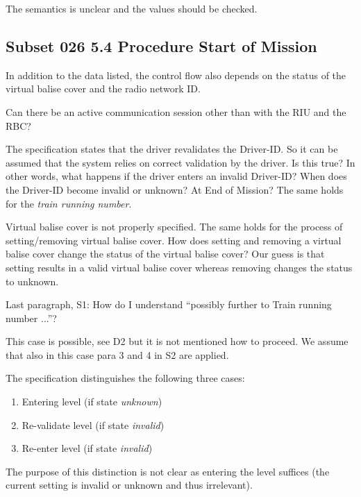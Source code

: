 \documentclass{template/openetcs_article}
\begin{document}
\resolution The semantics is unclear and the values should be checked.


\subsection{Subset 026 5.4 Procedure Start of Mission}

In addition to the data listed, the control flow also depends on the status of the virtual balise cover and the radio network ID.


Can there be an active communication session other than with the RIU and the RBC?

The specification states that the driver revalidates the Driver-ID. So it can be assumed that the system relies on correct validation by the driver. Is this true? In other words, what happens if the driver enters an invalid Driver-ID? When does the Driver-ID become invalid or unknown? At End of Mission? The same holds for the \emph{train running number}.

Virtual balise cover is not properly specified. The same holds for the process of setting/removing virtual balise cover. How does setting and removing a virtual balise cover change the status of the virtual balise cover? Our guess is that setting results in a valid virtual balise cover whereas removing changes the status to unknown.

Last paragraph, S1: How do I understand ``possibly further to Train running number ...''?

This case is possible, see D2 but it is not mentioned how to proceed. We assume that also in this case para 3 and 4 in S2 are applied.

The specification distinguishes the following three cases:
\begin{enumerate}
   \item Entering level (if state \emph{unknown})
   \item Re-validate level (if state \emph{invalid})
   \item Re-enter level (if state \emph{invalid})
\end{enumerate}
The purpose of this distinction is not clear as entering the level suffices (the current setting is invalid or unknown and thus irrelevant).
\end{document}
